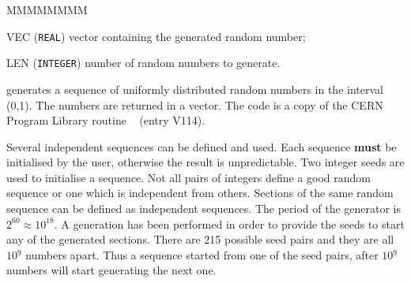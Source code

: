       
      
 
\begin{DLtt}{MMMMMMMM}
\item[VEC] ({\tt REAL}) vector containing the generated random number;
\item[LEN] ({\tt INTEGER}) number of random numbers to generate.
\end{DLtt}

 generates a sequence of uniformly distributed random numbers in the
interval (0,1). The numbers are returned in a vector.
The code is a copy
of the CERN Program Library routine ~\cite{bib-LECU,bib-JAM1} 
(entry V114).

Several independent sequences can be defined and used. Each sequence {\bf must}
be initialised by the user, otherwise the result is unpredictable. 
Two integer seeds are used to initialise a sequence. Not all pairs of
integers define a good random sequence or one which is independent from
others. Sections of the same random sequence can be defined as independent
sequences. The period of the generator is $2^{60} \approx 10^{18}$. 
A generation has
been performed in order to provide the seeds to start any of the generated
sections. There are 215 possible seed pairs and they are all $10{^9}$  numbers
apart. Thus a sequence started from one of the seed pairs, after $10{^9}$
numbers will start generating the next one. 

